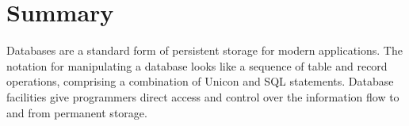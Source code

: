 \section{Summary}

Databases are a standard form of persistent storage for modern
applications. The notation for manipulating a database looks like
a sequence of table and record operations, comprising a
combination of Unicon and SQL statements. Database
facilities give programmers direct access and control over the
information flow to and from permanent storage.

